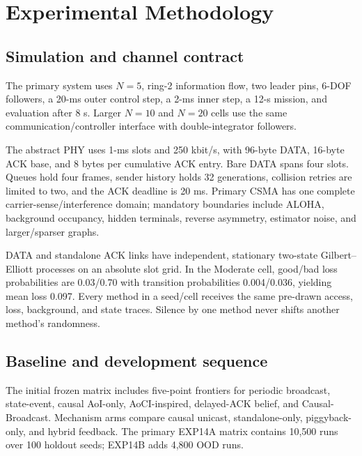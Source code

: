 \section{Experimental Methodology}
\label{sec:s2-methodology}

\subsection{Simulation and channel contract}

The primary system uses $N=5$, ring-2 information flow, two leader pins,
6-DOF followers, a 20-ms outer control step, a 2-ms inner step, a 12-s mission,
and evaluation after 8 s. Larger $N=10$ and $N=20$ cells use the same
communication/controller interface with double-integrator followers.

The abstract PHY uses 1-ms slots and 250 kbit/s, with 96-byte DATA, 16-byte ACK
base, and 8 bytes per cumulative ACK entry. Bare DATA spans four slots. Queues
hold four frames, sender history holds 32 generations, collision retries are
limited to two, and the ACK deadline is 20 ms. Primary CSMA has one complete
carrier-sense/interference domain; mandatory boundaries include ALOHA,
background occupancy, hidden terminals, reverse asymmetry, estimator noise,
and larger/sparser graphs.

DATA and standalone ACK links have independent, stationary two-state
Gilbert--Elliott processes on an absolute slot grid. In the Moderate cell,
good/bad loss probabilities are 0.03/0.70 with transition probabilities
0.004/0.036, yielding mean loss 0.097. Every method in a seed/cell receives
the same pre-drawn access, loss, background, and state traces. Silence by one
method never shifts another method's randomness.

\subsection{Baseline and development sequence}

The initial frozen matrix includes five-point frontiers for periodic
broadcast, state-event, causal AoI-only, AoCI-inspired, delayed-ACK belief, and
Causal-Broadcast. Mechanism arms compare causal unicast, standalone-only,
piggyback-only, and hybrid feedback. The primary EXP14A matrix contains 10,500
runs over 100 holdout seeds; EXP14B adds 4,800 OOD runs.

